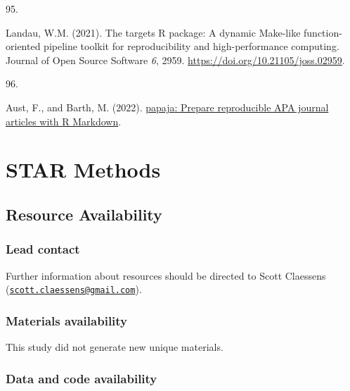 \documentclass[
  man, donotrepeattitle,floatsintext]{apa6}
\newlength{\cslhangindent}
\newlength{\csllabelwidth}
\newlength{\cslentryspacingunit} %
\newenvironment{CSLReferences}[2] %
 {%
  \setlength{\parindent}{0pt}
  \ifodd #1
  \let\oldpar\par
  \def\par{\hangindent=\cslhangindent\oldpar}
  \fi
  \setlength{\parskip}{#2\cslentryspacingunit}
 }%
 {}
\newcommand{\CSLLeftMargin}[1]{\parbox[t]{\csllabelwidth}{#1}}
\newcommand{\CSLRightInline}[1]{\parbox[t]{\linewidth - \csllabelwidth}{#1}\break}
\begin{document}
\begin{CSLReferences}{0}{0}
\leavevmode{}%
\CSLLeftMargin{95. }%
\CSLRightInline{Landau, W.M. (2021). The targets {R} package: A dynamic {M}ake-like function-oriented pipeline toolkit for reproducibility and high-performance computing. Journal of Open Source Software \emph{6}, 2959. \url{https://doi.org/10.21105/joss.02959}.}

\leavevmode{}%
\CSLLeftMargin{96. }%
\CSLRightInline{Aust, F., and Barth, M. (2022). \href{https://github.com/crsh/papaja}{{papaja}: {Prepare} reproducible {APA} journal articles with {R Markdown}}.}

\end{CSLReferences}

\endgroup

\newpage
\linenumbers

\hypertarget{star-methods}{%
\section{STAR Methods}\label{star-methods}}

\hypertarget{resource-availability}{%
\subsection{Resource Availability}\label{resource-availability}}

\hypertarget{lead-contact}{%
\subsubsection{Lead contact}\label{lead-contact}}

Further information about resources should be directed to Scott Claessens
(\href{mailto:scott.claessens@gmail.com}{\nolinkurl{scott.claessens@gmail.com}}).

\hypertarget{materials-availability}{%
\subsubsection{Materials availability}\label{materials-availability}}

This study did not generate new unique materials.

\hypertarget{data-and-code-availability}{%
\subsubsection{Data and code availability}\label{data-and-code-availability}}
\end{document}
